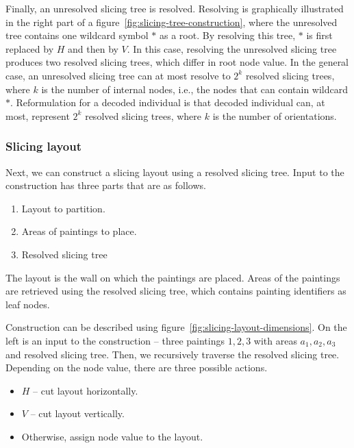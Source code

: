 Finally, an unresolved slicing tree is resolved.
Resolving is graphically illustrated in the right part of a figure~\ref{fig:slicing-tree-construction},
where the unresolved tree contains one wildcard symbol $*$ as a root.
By resolving this tree, $*$ is first replaced by $H$ and then by $V$.
In this case, resolving the unresolved slicing tree produces two resolved slicing trees,
which differ in root node value.
In the general case, an unresolved slicing tree can at most resolve to $2^k$ resolved slicing trees,
where $k$ is the number of internal nodes, i.e., the nodes that can contain wildcard $*$.
Reformulation for a decoded individual is that decoded individual can, at most, represent
$2^k$ resolved slicing trees, where $k$ is the number of orientations.



\subsubsection*{Slicing layout}

Next, we can construct a slicing layout using a resolved slicing tree.
Input to the construction has three parts that are as follows.

\begin{enumerate}
    \item Layout to partition.
    \item Areas of paintings to place.
    \item Resolved slicing tree
\end{enumerate}

The layout is the wall on which the paintings are placed.
Areas of the paintings are retrieved using the resolved slicing tree,
which contains painting identifiers as leaf nodes.

Construction can be described using figure~\ref{fig:slicing-layout-dimensions}.
On the left is an input to the construction – three paintings $1,2,3$ with areas $a_1, a_2, a_3$ and resolved slicing tree.
Then, we recursively traverse the resolved slicing tree.
Depending on the node value, there are three possible actions. 

\begin{itemize}
    \item $H$ – cut layout horizontally.
    \item $V$ – cut layout vertically.
    \item Otherwise, assign node value to the layout.
\end{itemize}

